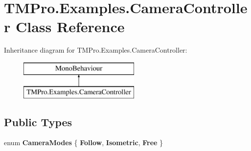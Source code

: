 \hypertarget{class_t_m_pro_1_1_examples_1_1_camera_controller}{}\section{T\+M\+Pro.\+Examples.\+Camera\+Controller Class Reference}
\label{class_t_m_pro_1_1_examples_1_1_camera_controller}
Inheritance diagram for T\+M\+Pro.\+Examples.\+Camera\+Controller\+:\begin{figure}[H]
\begin{center}
\leavevmode
\includegraphics[height=2.000000cm]{class_t_m_pro_1_1_examples_1_1_camera_controller}
\end{center}
\end{figure}
\subsection*{Public Types}
\begin{DoxyCompactItemize}
\item 
\mbox{\label{class_t_m_pro_1_1_examples_1_1_camera_controller_a8180251e92d62266c8a026f0b77452ce}} 
enum {\bfseries Camera\+Modes} \{ {\bfseries Follow}, 
{\bfseries Isometric}, 
{\bfseries Free}
 \}
\end{DoxyCompactItemize}
